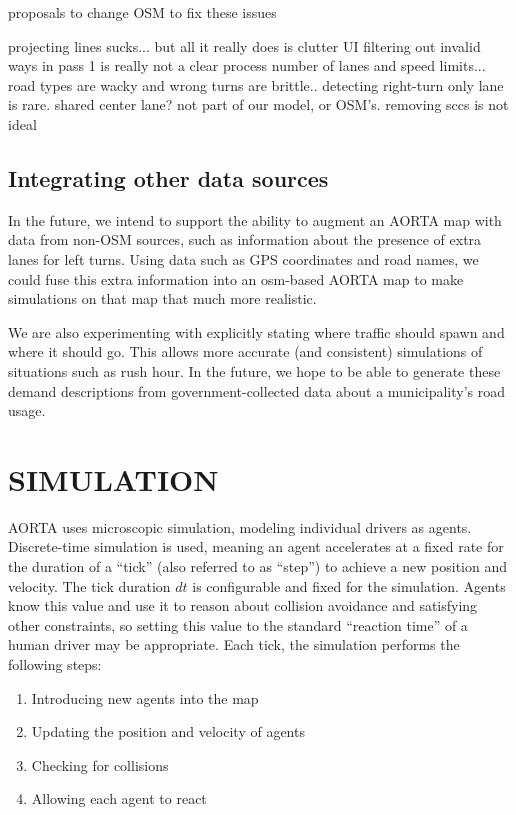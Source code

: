 \documentclass[letterpaper, 10 pt, conference]{ieeeconf}  %
\begin{document}
proposals to change OSM to fix these issues

projecting lines sucks... but all it really does is clutter UI
filtering out invalid ways in pass 1 is really not a clear process
number of lanes and speed limits... road types are wacky and wrong
turns are brittle.. detecting right-turn only lane is rare. shared center lane?
  not part of our model, or OSM's.
removing sccs is not ideal


\subsection{Integrating other data sources}

In the future, we intend to support the ability to augment an AORTA map with
data from non-OSM sources, such as information about the presence of extra lanes
for left turns.  Using data such as GPS coordinates and road names, we could fuse
this extra information into an osm-based AORTA map to make simulations on that map
that much more realistic.

We are also experimenting with explicitly stating where traffic should spawn and where
it should go.  This allows more accurate (and consistent) simulations of situations such
as rush hour.  In the future, we hope to be able to generate these demand descriptions
from government-collected data about a municipality's road usage.


\section{SIMULATION}

AORTA uses microscopic simulation, modeling individual drivers as agents.
Discrete-time simulation is used, meaning an agent accelerates at a fixed rate
for the duration of a ``tick'' (also referred to as ``step'') to achieve a new
position and velocity. The tick duration $dt$ is configurable and fixed for the
simulation. Agents know this value and use it to reason about collision
avoidance and satisfying other constraints, so setting this value to the
standard ``reaction time'' of a human driver may be appropriate. Each tick, the
simulation performs the following steps:

\begin{enumerate}
  \item Introducing new agents into the map
  \item Updating the position and velocity of agents
  \item Checking for collisions
  \item Allowing each agent to react
\end{enumerate}
\end{document}
